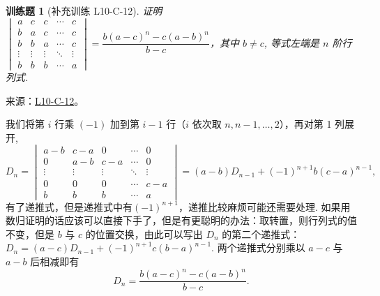 \documentclass[UTF8,12pt,a4paper,fontset=fandol]{ctexart}
\newtheorem{exercise}{训练题}[section]
\begin{document}
\begin{exercise}[补充训练 L10-C-12]\label{prob:L10-C-12}
证明$\begin{vmatrix}
                a      & c      & c      & \cdots & c      \\
                b      & a      & c      & \cdots & c      \\
                b      & b      & a      & \cdots & c      \\
                \vdots & \vdots & \vdots & \ddots & \vdots \\
                b      & b      & b      & \cdots & a
            \end{vmatrix}=\dfrac{b(a-c)^{n}-c(a-b)^{n}}{b-c}$，其中 $b \neq c$, 等式左端是 $n$ 阶行列式.
\end{exercise}
\noindent 来源：\href{https://github.com/yhwu-is/Linear-Algebra-Left-Undone/blob/new/%E8%AE%B2%E4%B9%89/%E4%B8%93%E9%A2%98/10%20%E8%A1%8C%E5%88%97%E5%BC%8F.tex}{L10-C-12}。
\begin{solve}
我们将第 $i$ 行乘 $(-1)$ 加到第 $i-1$ 行（$i$ 依次取 $n, n-1, \ldots, 2$），再对第 1 列展开,
            \[D_{n}=\begin{vmatrix}
                    a-b    & c-a    & 0      & \cdots & 0      \\
                    0      & a-b    & c-a    & \cdots & 0      \\
                    \vdots & \vdots & \vdots & \ddots & \vdots \\
                    0      & 0      & 0      & \cdots & c-a    \\
                    b      & b      & b      & \cdots & a
                \end{vmatrix}=(a-b)D_{n-1}+(-1)^{n+1}b(c-a)^{n-1},\]
            有了递推式，但是递推式中有$(-1)^{n+1}$，递推比较麻烦可能还需要处理. 如果用数归证明的话应该可以直接下手了，但是有更聪明的办法：取转置，则行列式的值不变，但是 $b$ 与 $c$ 的位置交换，由此可以写出 $D_n$ 的第二个递推式：$D_n=(a-c)D_{n-1}+(-1)^{n+1}c(b-a)^{n-1}$. 两个递推式分别乘以 $a-c$ 与 $a-b$ 后相减即有
            \[
                D_n=\dfrac{b(a-c)^{n}-c(a-b)^{n}}{b-c}.
            \]
\end{solve}
\end{document}
